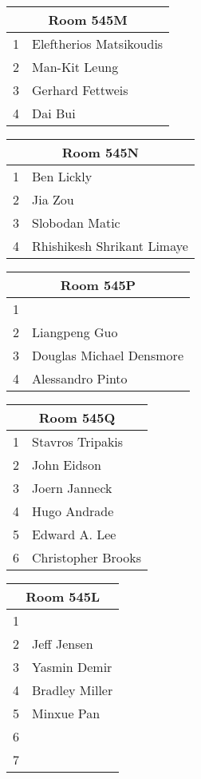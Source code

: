 \documentclass{article}
\begin{document}
\noindent
\begin{tabular}{|l|l|}
\hline
\multicolumn{2}{|c|}{Room 545M} \\ \hline\hline
1&Eleftherios Matsikoudis\\
2&Man-Kit Leung\\
3&Gerhard Fettweis\\
4&Dai Bui\\

\hline
\end{tabular}
\vspace{1in}

\noindent
\begin{tabular}{|l|l|}
\hline
\multicolumn{2}{|c|}{Room 545N} \\ \hline\hline
1&Ben Lickly\\
2&Jia Zou\\
3&Slobodan Matic\\
4&Rhishikesh Shrikant Limaye\\

\hline
\end{tabular}
\vspace{1in}

\noindent
\begin{tabular}{|l|l|}
\hline
\multicolumn{2}{|c|}{Room 545P} \\ \hline\hline
1& \\
2&Liangpeng Guo\\
3&Douglas Michael Densmore\\
4&Alessandro Pinto\\

\hline
\end{tabular}
\vspace{1in}

\noindent
\begin{tabular}{|l|l|}
\hline
\multicolumn{2}{|c|}{Room 545Q} \\ \hline\hline
1&Stavros Tripakis\\
2&John Eidson\\
3&Joern Janneck\\
4&Hugo Andrade\\
5&Edward A. Lee\\
6&Christopher Brooks\\

\hline
\end{tabular}
\vspace{1in}

\noindent
\begin{tabular}{|l|l|}
\hline
\multicolumn{2}{|c|}{Room 545L} \\ \hline\hline
1& \\
2&Jeff Jensen\\
3&Yasmin Demir\\
4&Bradley Miller\\
5&Minxue Pan\\
6& \\
7& \\

\hline
\end{tabular}
\vspace{1in}
\end{document}
